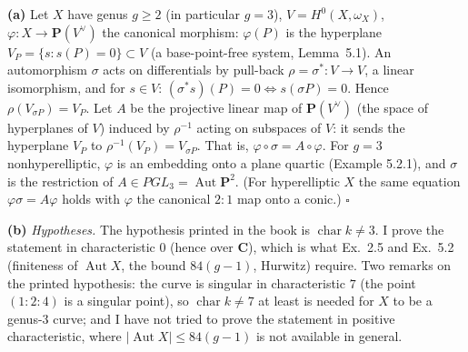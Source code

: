 \documentclass[11pt]{article}
\begin{document}
\pf
\textbf{(a)} Let $X$ have genus $g\ge2$ (in particular $g=3$), $V=H^0(X,\omega_X)$, $\varphi:X\to\mathbf P(V^\vee)$ the canonical morphism: $\varphi(P)$ is the hyperplane $V_P=\{s:s(P)=0\}\subset V$ (a base-point-free system, Lemma~5.1). An automorphism $\sigma$ acts on differentials by pull-back $\rho=\sigma^*:V\to V$, a linear isomorphism, and for $s\in V$: $(\sigma^*s)(P)=0\iff s(\sigma P)=0$. Hence $\rho(V_{\sigma P})=V_P$. Let $A$ be the projective linear map of $\mathbf P(V^\vee)$ (the space of hyperplanes of $V$) induced by $\rho^{-1}$ acting on subspaces of $V$: it sends the hyperplane $V_P$ to $\rho^{-1}(V_P)=V_{\sigma P}$. That is, $\varphi\circ\sigma=A\circ\varphi$. For $g=3$ nonhyperelliptic, $\varphi$ is an embedding onto a plane quartic (Example 5.2.1), and $\sigma$ is the restriction of $A\in PGL_3=\operatorname{Aut}\mathbf P^2$. (For hyperelliptic $X$ the same equation $\varphi\sigma=A\varphi$ holds with $\varphi$ the canonical $2:1$ map onto a conic.) \hfill$\square$

\textbf{(b)} \emph{Hypotheses.} The hypothesis printed in the book is $\operatorname{char}k\ne3$. I prove the statement in characteristic $0$ (hence over $\mathbf C$), which is what Ex.~2.5 and Ex.~5.2 (finiteness of $\operatorname{Aut}X$, the bound $84(g-1)$, Hurwitz) require. Two remarks on the printed hypothesis: the curve is singular in characteristic $7$ (the point $(1:2:4)$ is a singular point), so $\operatorname{char}k\ne7$ at least is needed for $X$ to be a genus-$3$ curve; and I have not tried to prove the statement in positive characteristic, where $|\operatorname{Aut}X|\le84(g-1)$ is not available in general.
\end{document}
